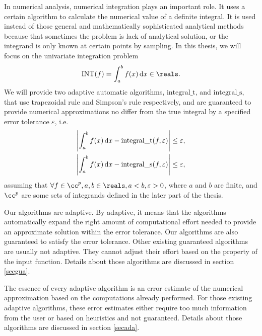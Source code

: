 \documentclass{iitthesis}
\theoremstyle{definition}
\theoremstyle{remark}
\begin{document}
In numerical analysis, numerical integration plays an important role. It uses a certain algorithm to calculate the numerical value of a definite integral. It is used instead of those general and mathematically sophisticated analytical methods because that sometimes the problem is lack of analytical solution, or the integrand is only known at certain points by sampling. In this thesis, we will focus on the univariate integration problem
\begin{equation}\label{integral}
    \text{INT}(f)=\int_{a}^{b}f(x)\,\textup{d}x\in\reals.
\end{equation}
We will provide two adaptive automatic algorithms, $\text{integral}\_\text{t}$, and $\text{integral}\_\text{s}$, that use trapezoidal rule and Simpson's rule respectively, and are guaranteed to provide numerical approximations no differ from the true integral by a specified error tolerance $\varepsilon$, i.e.
\begin{align}\label{approx}
      \left|\int_{a}^{b}f(x)\,\textup{d}x-\text{integral}\_\text{t}(f,\varepsilon)\right|\leq \varepsilon,& \\
      \left|\int_{a}^{b}f(x)\,\textup{d}x-\text{integral}\_\text{s}(f,\varepsilon)\right|\leq \varepsilon,&
\end{align}
assuming that $\forall f \in \cc^{p}, a,b\in\reals, a<b, \varepsilon>0$, where $a$ and $b$ are finite, and $\cc^{p}$ are some sets of integrands defined in the later part of the thesis.

Our algorithms are adaptive. By adaptive, it means that the algorithms automatically expand the right amount of computational effort needed to provide an approximate solution within the error tolerance. Our algorithms are also guaranteed to satisfy the error tolerance. Other existing guaranteed algorithms are usually not adaptive. They cannot adjust their effort based on the property of the input function. Details about those algorithms are discussed in section \ref{secgua}.

The essence of every adaptive algorithm is an error estimate of the numerical approximation based on the computations already performed. For those existing adaptive algorithms, these error estimates either require too much information from the user or based on heuristics and not guaranteed. Details about those algorithms are discussed in section \ref{secada}.
\end{document}
